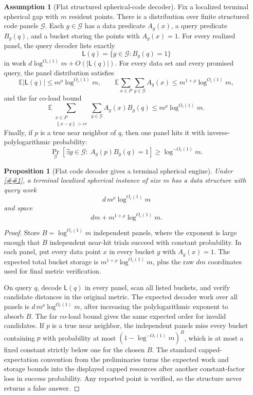 \documentclass[10pt]{article}
\newcommand{\cref}[1]{\ref{##1}}
\newtheorem{proposition}[theorem]{Proposition}
\theoremstyle{definition}
\newtheorem{assumption}[theorem]{Assumption}
\newcommand{\E}{\mathbb{E}}
\begin{document}
\begin{assumption}[Flat structured spherical-code decoder]
   \label{asm:flat-spherical-code-decoder}
   Fix a localized terminal spherical gap with \(m\) resident points.  There is
   a distribution over finite structured code panels \(\mathcal G\).  Each
   \(g\in\mathcal G\) has a data predicate \(A_g(x)\), a query predicate
   \(B_g(q)\), and a bucket storing the points with \(A_g(x)=1\).  For every
   realized panel, the query decoder lists exactly
   \[
      \mathsf L(q)=\{g\in\mathcal G:B_g(q)=1\}
   \]
   in work \(d\log^{O_c(1)}m+O(|\mathsf L(q)|)\).  For every data set and
   every promised query, the panel distribution satisfies
   \[
      \E|\mathsf L(q)|\le m^\rho\log^{O_c(1)}m,
      \qquad
      \E\sum_{x\in P}\sum_{g\in\mathcal G}A_g(x)
      \le m^{1+\rho}\log^{O_c(1)}m,
   \]
   and the far co-load bound
   \[
      \E\sum_{\substack{x\in P\\ \|x-q\|>cr}}
      \sum_{g\in\mathcal G}A_g(x)B_g(q)
      \le m^\rho\log^{O_c(1)}m .
   \]
   Finally, if \(p\) is a true near neighbor of \(q\), then one panel hits it
   with inverse-polylogarithmic probability:
   \[
      \Pr_{\mathcal G}\!\left[
         \exists g\in\mathcal G:\ A_g(p)B_g(q)=1
      \right]\ge \log^{-O_c(1)}m .
   \]
\end{assumption}

\begin{proposition}[Flat code decoder gives a terminal spherical engine]
   \label{prop:flat-spherical-code-terminal}
   Under \cref{asm:flat-spherical-code-decoder}, a terminal localized
   spherical instance of size \(m\) has a data structure with query work
   \[
      d\,m^\rho\log^{O_c(1)}m
   \]
   and space
   \[
      dm+m^{1+\rho}\log^{O_c(1)}m .
   \]
\end{proposition}

\begin{proof}
   Store \(B=\log^{O_c(1)}m\) independent panels, where the exponent is large
   enough that \(B\) independent near-hit trials succeed with constant
   probability.  In each panel, put every data point \(x\) in every bucket
   \(g\) with \(A_g(x)=1\).  The expected total bucket storage is
   \(m^{1+\rho}\log^{O_c(1)}m\), plus the raw \(dm\) coordinates used for final
   metric verification.

   On query \(q\), decode \(\mathsf L(q)\) in every panel, scan all listed
   buckets, and verify candidate distances in the original metric.  The
   expected decoder work over all panels is
   \(d\,m^\rho\log^{O_c(1)}m\), after increasing the polylogarithmic exponent
   to absorb \(B\).  The far co-load bound gives the same expected order for
   invalid candidates.  If \(p\) is a true near neighbor, the independent panels
   miss every bucket containing \(p\) with probability at most
   \((1-\log^{-O_c(1)}m)^B\), which is at most a fixed constant strictly below
   one for the chosen \(B\).  The standard capped-expectation convention from the
   preliminaries turns the expected work and storage bounds into the displayed
   capped resources after another constant-factor loss in success probability.
   Any reported point is verified, so the structure never returns a false
   answer.
\end{proof}
\end{document}
